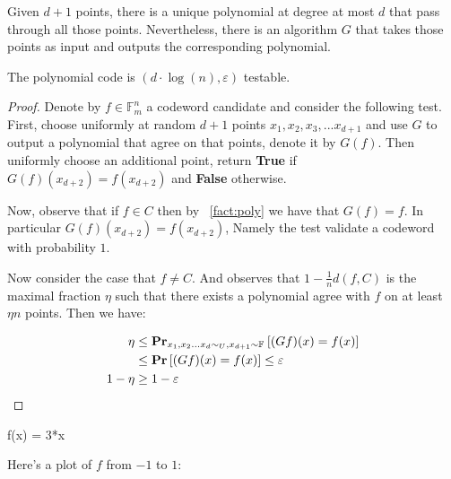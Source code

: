 \begin{fact} \label{fact:poly}
  Given $d+1$ points, there is a unique polynomial at degree at most $d$ that pass through all those points. Nevertheless, there is an algorithm $G$ that takes those points as input and outputs the corresponding polynomial.   
\end{fact}

\begin{lemma} The polynomial code is $\left(d \cdot \log\left( n \right), \varepsilon  \right) $ testable.   

\end{lemma}
\begin{proof}
Denote by $f \in \mathbb{F}_{m}^{n}$ a codeword candidate and consider the following test. First, choose uniformly at random $d+1$ points $x_{1}, x_{2}, x_{3}, ... x_{d+1}$ and use $G$ to output a polynomial that agree on that points, denote it by $G\left( f \right)$. Then uniformly choose an additional point, return \textbf{True} if $G\left( f \right)(x_{d+2}) = f\left( x_{d+2} \right)$ and \textbf{False} otherwise.   

  Now, observe that if $f\in C$ then by ~\cref{fact:poly} we have that $G\left( f \right) = f$. In particular $G\left( f \right)(x_{d+2}) = f\left( x_{d+2} \right)$, Namely the test validate a codeword with probability $1$.   

  Now consider the case that $f \neq C$. And observes that $1 - \frac{1}{n} d\left( f, C \right)$ is the maximal fraction $\eta$ such that there exists a polynomial agree with $f$ on at least $\eta n$ points. Then we have:

  \begin{equation*}
    \begin{split}
      \eta & \le \mathbf{Pr}_{x_{1}, x_{2} ... x_{d} \sim_{U}, x_{d+1}\sim \mathbb{F}_{}}\left[ (Gf)(x) = f(x) \right] \\ & \le \mathbf{Pr} \left[ { (Gf)(x) = f(x)} \right] \le \varepsilon \\
       1 - \eta & \ge 1 - \varepsilon 
    \end{split}
  \end{equation*}
\end{proof}

\begin{sagesilent}
  f(x) = 3*x 
\end{sagesilent}
Here's a plot of $f$ from $-1$ to $1$:
\begin{center}
\end{center}
